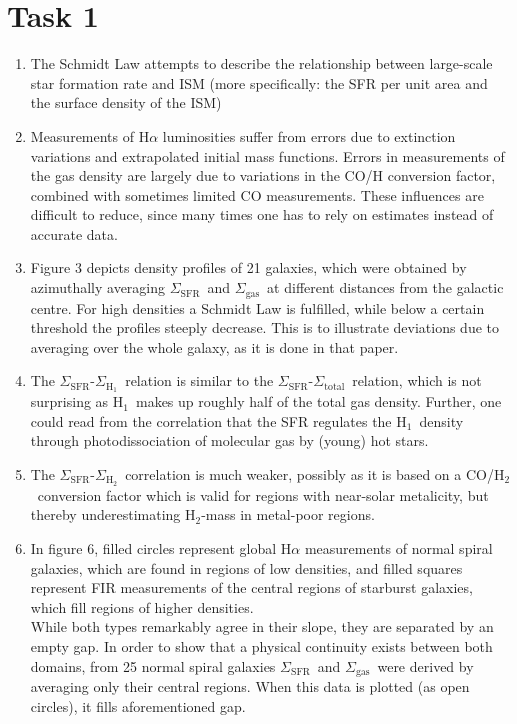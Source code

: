 \documentclass[11pt,a4paper]{scrartcl}
\newcommand{\SFR}{\ensuremath{\Sigma_{\mathrm{SFR}}}}
\newcommand{\ISM}{\ensuremath{\Sigma_{\mathrm{gas}}}}
\newcommand{\ISMtotal}{\ensuremath{\Sigma_{\mathrm{total}}}}
\newcommand{\ISMHI}{\ensuremath{\Sigma_{\mathrm{H}_1}}}
\newcommand{\ISMHII}{\ensuremath{\Sigma_{\mathrm{H}_2}}}
\newcommand{\HI}{\ensuremath{\mathrm{H}_1}}
\newcommand{\HII}{\ensuremath{\mathrm{H}_2}}
\begin{document}
\section*{Task 1}

\begin{enumerate}[label=\textbf{\large(\alph*)}, itemsep=\baselineskip]

\item
    The Schmidt Law attempts to describe the relationship between large-scale
    star formation rate and ISM (more specifically: the SFR per unit area and
    the surface density of the ISM)

\item
    Measurements of H$\alpha$ luminosities suffer from errors due to extinction
    variations and extrapolated initial mass functions. Errors in measurements
    of the gas density are largely due to variations in the CO/H conversion
    factor, combined with sometimes limited CO measurements. These influences
    are difficult to reduce, since many times one has to rely on estimates
    instead of accurate data.

\item
    Figure 3 depicts density profiles of 21 galaxies, which were
    obtained by azimuthally averaging \SFR~and \ISM~at different distances from
    the galactic centre. For high densities a Schmidt Law is fulfilled, while
    below a certain threshold the profiles steeply decrease. This is to
    illustrate deviations due to averaging over the whole galaxy, as it is
    done in that paper.

\item
    The \SFR-\ISMHI~relation is similar to the \SFR-\ISMtotal~relation, which
    is not surprising as \HI~makes up roughly half of the total gas
    density. Further, one could read from the correlation that the SFR
    regulates the \HI~density through photodissociation of molecular gas by
    (young) hot stars.

\item
    The \SFR-\ISMHII~correlation is much weaker, possibly as it is based on a
    CO/\HII~conversion factor which is valid for regions with near-solar
    metalicity, but thereby underestimating \HII-mass in metal-poor regions.

\item
    In figure 6, filled circles represent global H$\alpha$ measurements of normal
    spiral galaxies, which are found in regions of low densities, and filled
    squares represent FIR measurements of the central regions of starburst
    galaxies, which fill regions of higher densities. \\
    While both types remarkably agree in their slope, they are separated by an
    empty gap. In order to show that a physical continuity exists between both
    domains, from 25 normal spiral galaxies \SFR~and \ISM~were derived by
    averaging only their central regions. When this data is plotted (as open
    circles), it fills aforementioned gap.


\end{enumerate}
\end{document}
